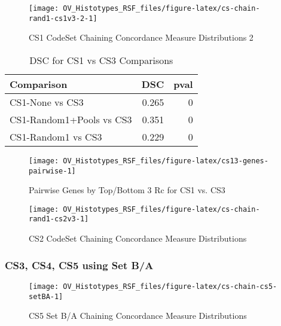 \documentclass[
]{report}
\begin{document}
\begin{figure}[H]

{\centering \texttt{[image: OV\_Histotypes\_RSF\_files/figure-latex/cs-chain-rand1-cs1v3-2-1]} 

}

\caption{CS1 CodeSet Chaining Concordance Measure Distributions 2}\label{fig:cs-chain-rand1-cs1v3-2}
\end{figure}

\begin{table}

\caption{\label{tab:cs13-dsc}DSC for CS1 vs CS3 Comparisons}
\centering
\begin{tabular}[t]{l|r|r}
\hline
Comparison & DSC & pval\\
\hline
CS1-None vs CS3 & 0.265 & 0\\
\hline
CS1-Random1+Pools vs CS3 & 0.351 & 0\\
\hline
CS1-Random1 vs CS3 & 0.229 & 0\\
\hline
\end{tabular}
\end{table}

\begin{figure}[H]

{\centering \texttt{[image: OV\_Histotypes\_RSF\_files/figure-latex/cs13-genes-pairwise-1]} 

}

\caption{Pairwise Genes by Top/Bottom 3 Rc for CS1 vs. CS3}\label{fig:cs13-genes-pairwise}
\end{figure}

\begin{figure}[H]

{\centering \texttt{[image: OV\_Histotypes\_RSF\_files/figure-latex/cs-chain-rand1-cs2v3-1]} 

}

\caption{CS2 CodeSet Chaining Concordance Measure Distributions}\label{fig:cs-chain-rand1-cs2v3}
\end{figure}

\hypertarget{cs3-cs4-cs5-using-set-ba}{%
\subsubsection{CS3, CS4, CS5 using Set B/A}\label{cs3-cs4-cs5-using-set-ba}}

\begin{figure}[H]

{\centering \texttt{[image: OV\_Histotypes\_RSF\_files/figure-latex/cs-chain-cs5-setBA-1]} 

}

\caption{CS5 Set B/A Chaining Concordance Measure Distributions}\label{fig:cs-chain-cs5-setBA}
\end{figure}
\end{document}
